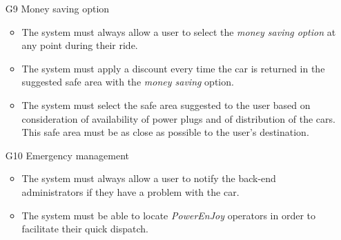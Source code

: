 \begin{itemize}
				\item [G9] Money saving option %
					\begin{itemize}
						\item The system must always allow a user to select the \textit{money saving option} at any point during their ride. 
						\item The system must apply a discount every time the car is returned in the suggested safe area with the \textit{money saving} option.
						\item The system must select the safe area suggested to the user based on consideration of availability of power plugs and of distribution of the cars. This safe area must be as close as possible to the user's destination. %
					\end{itemize}
					
				\item [G10] Emergency management %
					\begin{itemize}
						\item The system must always allow a user to notify the back-end administrators if they have a problem with the car.
						\item The system must be able to locate \textit{PowerEnJoy} operators in order to facilitate their quick dispatch.
					\end{itemize}
					

\end{itemize}
